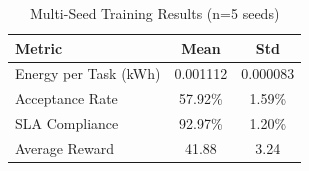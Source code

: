 
\begin{table}[h]
\centering
\caption{Multi-Seed Training Results (n=5 seeds)}
\label{tab:multi_seed}
\begin{tabular}{lcc}
\toprule
\textbf{Metric} & \textbf{Mean} & \textbf{Std} \\
\midrule
Energy per Task (kWh) & 0.001112 & 0.000083 \\
Acceptance Rate & 57.92\% & 1.59\% \\
SLA Compliance & 92.97\% & 1.20\% \\
Average Reward & 41.88 & 3.24 \\
\bottomrule
\end{tabular}
\end{table}
